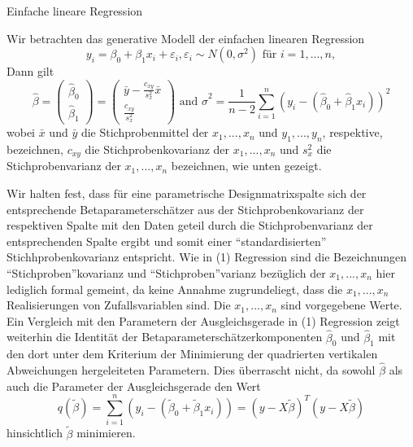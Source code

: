 \documentclass[
  8pt,
  ignorenonframetext,
]{beamer}
\begin{document}
\begin{frame}{Einfache lineare Regression}
\protect\hypertarget{einfache-lineare-regression}{}
\footnotesize

Wir betrachten das generative Modell der einfachen linearen Regression
\begin{equation}\label{eq:slr}
y_i = \beta_0 + \beta_1x_i + \varepsilon_i, \varepsilon_i \sim N(0,\sigma^2) \mbox{ für } i = 1,...,n,
\end{equation} Dann gilt \begin{equation}\label{eq:slr_estimators}
\hat{\beta}
= \begin{pmatrix} \hat{\beta}_0 \\ \hat{\beta}_1 \end{pmatrix}
= \begin{pmatrix} \bar{y} - \frac{c_{xy}}{s_x^2}\bar{x} \\ \frac{c_{xy}}{s_x^2} \end{pmatrix}
\mbox{ and }
\hat{\sigma}^2 = \frac{1}{n-2}\sum_{i=1}^n (y_i - (\hat{\beta}_0 + \hat{\beta}_1x_i))^2
\end{equation} wobei \(\bar{x}\) und \(\bar{y}\) die Stichprobenmittel
der \(x_1,...,x_n\) und \(y_1,...,y_n\), respektive, bezeichnen,
\(c_{xy}\) die Stichprobenkovarianz der \(x_1, ...,x_n\) und \(s_x^2\)
die Stichprobenvarianz der \(x_1,...,x_n\) bezeichnen, wie unten
gezeigt.

Wir halten fest, dass für eine parametrische Designmatrixspalte sich der
entsprechende Betaparameterschätzer aus der Stichprobenkovarianz der
respektiven Spalte mit den Daten geteil durch die Stichprobenvarianz der
entsprechenden Spalte ergibt und somit einer ``standardisierten''
Stichhprobenkovarianz entspricht. Wie in (1) Regression sind die
Bezeichnungen ``Stichproben''kovarianz und ``Stichproben''varianz
bezüglich der \(x_1,...,x_n\) hier lediglich formal gemeint, da keine
Annahme zugrundeliegt, dass die \(x_1,...,x_n\) Realisierungen von
Zufallsvariablen sind. Die \(x_1,...,x_n\) sind vorgegebene Werte. Ein
Vergleich mit den Parametern der Ausgleichsgerade in (1) Regression
zeigt weiterhin die Identität der Betaparameterschätzerkomponenten
\(\hat{\beta}_0\) und \(\hat{\beta}_1\) mit den dort unter dem Kriterium
der Minimierung der quadrierten vertikalen Abweichungen hergeleiteten
Parametern. Dies überrascht nicht, da sowohl \(\hat{\beta}\) als auch
die Parameter der Ausgleichsgerade den Wert\\
\begin{equation}
q(\tilde{\beta}) = \sum_{i=1}^n (y_i - (\tilde{\beta}_0 + \tilde{\beta}_1 x_i)) = (y - X\tilde{\beta})^T(y - X\tilde{\beta})
\end{equation} hinsichtlich \(\tilde{\beta}\) minimieren.
\end{frame}
\end{document}
